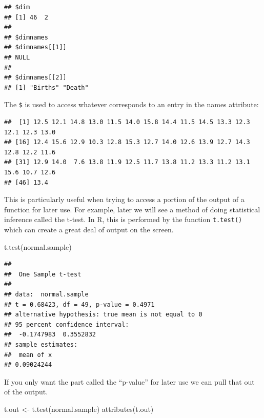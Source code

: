 \documentclass[
]{book}
\newenvironment{Shaded}{\begin{snugshade}}{\end{snugshade}}
\newcommand{\FunctionTok}[1]{\textcolor[rgb]{0.00,0.00,0.00}{#1}}
\newcommand{\NormalTok}[1]{#1}
\newcommand{\OtherTok}[1]{\textcolor[rgb]{0.56,0.35,0.01}{#1}}
\newcommand{\SpecialCharTok}[1]{\textcolor[rgb]{0.00,0.00,0.00}{#1}}
\begin{document}
\begin{verbatim}
## $dim
## [1] 46  2
## 
## $dimnames
## $dimnames[[1]]
## NULL
## 
## $dimnames[[2]]
## [1] "Births" "Death"
\end{verbatim}

The \texttt{\$} is used to access whatever corresponds to an entry in the names attribute:

\begin{Shaded}
\end{Shaded}

\begin{verbatim}
##  [1] 12.5 12.1 14.8 13.0 11.5 14.0 15.8 14.4 11.5 14.5 13.3 12.3 12.1 12.3 13.0
## [16] 12.4 15.6 12.9 10.3 12.8 15.3 12.7 14.0 12.6 13.9 12.7 14.3 12.8 12.2 11.6
## [31] 12.9 14.0  7.6 13.8 11.9 12.5 11.7 13.8 11.2 13.3 11.2 13.1 15.6 10.7 12.6
## [46] 13.4
\end{verbatim}

This is particularly useful when trying to access a portion of the output of a function for later use. For example, later we will see a method of doing statistical inference called the t-test. In R, this is performed by the function \texttt{t.test()} which can create a great deal of output on the screen.

\begin{Shaded}
\begin{Highlighting}[]
\FunctionTok{t.test}\NormalTok{(normal.sample)}
\end{Highlighting}
\end{Shaded}

\begin{verbatim}
## 
##  One Sample t-test
## 
## data:  normal.sample
## t = 0.68423, df = 49, p-value = 0.4971
## alternative hypothesis: true mean is not equal to 0
## 95 percent confidence interval:
##  -0.1747983  0.3552832
## sample estimates:
##  mean of x 
## 0.09024244
\end{verbatim}

If you only want the part called the ``p-value'' for later use we can pull that out of the output.

\begin{Shaded}
\begin{Highlighting}[]
\NormalTok{t.out }\OtherTok{\textless{}{-}} \FunctionTok{t.test}\NormalTok{(normal.sample)}
\FunctionTok{attributes}\NormalTok{(t.out)}
\end{Highlighting}
\end{Shaded}
\end{document}
